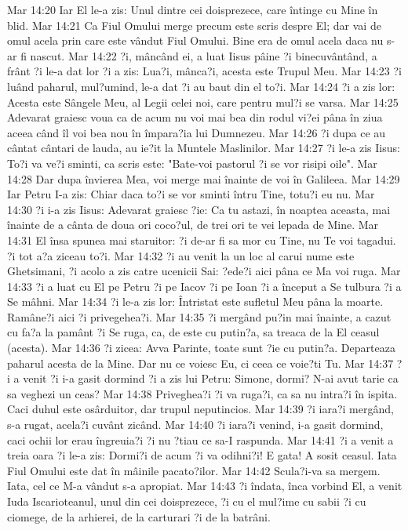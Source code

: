 Mar 14:20  Iar El le-a zis: Unul dintre cei doisprezece, care întinge cu Mine în blid.
Mar 14:21  Ca Fiul Omului merge precum este scris despre El; dar vai de omul acela prin care este vândut Fiul Omului. Bine era de omul acela daca nu s-ar fi nascut.
Mar 14:22  ?i, mâncând ei, a luat Iisus pâine ?i binecuvântând, a frânt ?i le-a dat lor ?i a zis: Lua?i, mânca?i, acesta este Trupul Meu.
Mar 14:23  ?i luând paharul, mul?umind, le-a dat ?i au baut din el to?i.
Mar 14:24  ?i a zis lor: Acesta este Sângele Meu, al Legii celei noi, care pentru mul?i se varsa.
Mar 14:25  Adevarat graiesc voua ca de acum nu voi mai bea din rodul vi?ei pâna în ziua aceea când îl voi bea nou în împara?ia lui Dumnezeu.
Mar 14:26  ?i dupa ce au cântat cântari de lauda, au ie?it la Muntele Maslinilor.
Mar 14:27  ?i le-a zis Iisus: To?i va ve?i sminti, ca scris este: "Bate-voi pastorul ?i se vor risipi oile".
Mar 14:28  Dar dupa învierea Mea, voi merge mai înainte de voi în Galileea.
Mar 14:29  Iar Petru I-a zis: Chiar daca to?i se vor sminti întru Tine, totu?i eu nu.
Mar 14:30  ?i i-a zis Iisus: Adevarat graiesc ?ie: Ca tu astazi, în noaptea aceasta, mai înainte de a cânta de doua ori coco?ul, de trei ori te vei lepada de Mine.
Mar 14:31  El însa spunea mai staruitor: ?i de-ar fi sa mor cu Tine, nu Te voi tagadui. ?i tot a?a ziceau to?i.
Mar 14:32  ?i au venit la un loc al carui nume este Ghetsimani, ?i acolo a zis catre ucenicii Sai: ?ede?i aici pâna ce Ma voi ruga.
Mar 14:33  ?i a luat cu El pe Petru ?i pe Iacov ?i pe Ioan ?i a început a Se tulbura ?i a Se mâhni.
Mar 14:34  ?i le-a zis lor: Întristat este sufletul Meu pâna la moarte. Ramâne?i aici ?i privegehea?i.
Mar 14:35  ?i mergând pu?in mai înainte, a cazut cu fa?a la pamânt ?i Se ruga, ca, de este cu putin?a, sa treaca de la El ceasul (acesta).
Mar 14:36  ?i zicea: Avva Parinte, toate sunt ?ie cu putin?a. Departeaza paharul acesta de la Mine. Dar nu ce voiesc Eu, ci ceea ce voie?ti Tu.
Mar 14:37  ?i a venit ?i i-a gasit dormind ?i a zis lui Petru: Simone, dormi? N-ai avut tarie ca sa veghezi un ceas?
Mar 14:38  Priveghea?i ?i va ruga?i, ca sa nu intra?i în ispita. Caci duhul este osârduitor, dar trupul neputincios.
Mar 14:39  ?i iara?i mergând, s-a rugat, acela?i cuvânt zicând.
Mar 14:40  ?i iara?i venind, i-a gasit dormind, caci ochii lor erau îngreuia?i ?i nu ?tiau ce sa-I raspunda.
Mar 14:41  ?i a venit a treia oara ?i le-a zis: Dormi?i de acum ?i va odihni?i! E gata! A sosit ceasul. Iata Fiul Omului este dat în mâinile pacato?ilor.
Mar 14:42  Scula?i-va sa mergem. Iata, cel ce M-a vândut s-a apropiat.
Mar 14:43  ?i îndata, înca vorbind El, a venit Iuda Iscarioteanul, unul din cei doisprezece, ?i cu el mul?ime cu sabii ?i cu ciomege, de la arhierei, de la carturari ?i de la batrâni.
